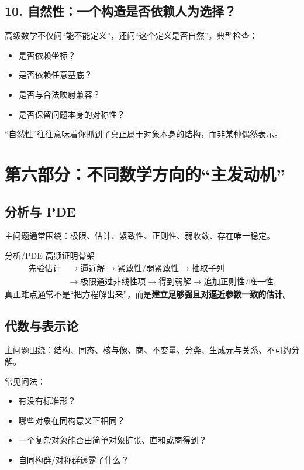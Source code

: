 \documentclass[11pt,a4paper]{ctexart}
\begin{document}
\subsection{10. 自然性：一个构造是否依赖人为选择？}
高级数学不仅问“能不能定义”，还问“这个定义是否自然”。典型检查：
\begin{itemize}
  \item 是否依赖坐标？
  \item 是否依赖任意基底？
  \item 是否与合法映射兼容？
  \item 是否保留问题本身的对称性？
\end{itemize}
“自然性”往往意味着你抓到了真正属于对象本身的结构，而非某种偶然表示。

\section{第六部分：不同数学方向的“主发动机”}

\subsection{分析与 PDE}
主问题通常围绕：极限、估计、紧致性、正则性、弱收敛、存在唯一稳定。

\begin{corebox}{分析/PDE 高频证明骨架}
\[
\begin{aligned}
\text{先验估计}&\to\text{逼近解}\to\text{紧致性/弱紧致性}\to\text{抽取子列}\\
&\to\text{极限通过非线性项}\to\text{得到弱解}\to\text{追加正则性/唯一性}.
\end{aligned}
\]
真正难点通常不是“把方程解出来”，而是\textbf{建立足够强且对逼近参数一致的估计}。
\end{corebox}

\subsection{代数与表示论}
主问题围绕：结构、同态、核与像、商、不变量、分类、生成元与关系、不可约分解。

常见问法：
\begin{itemize}
  \item 有没有标准形？
  \item 哪些对象在同构意义下相同？
  \item 一个复杂对象能否由简单对象扩张、直和或商得到？
  \item 自同构群/对称群透露了什么？
\end{itemize}
\end{document}
